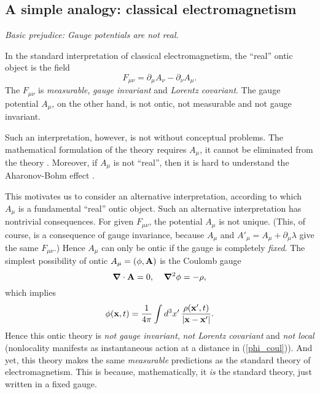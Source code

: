 \documentclass[12pt]{article}
\begin{document}
\subsection{A simple analogy: classical electromagnetism}
\label{SECanalogy}

\begin{flushright}
{\it Basic prejudice: Gauge potentials are not real.} 
\end{flushright}

In the standard interpretation of classical electromagnetism,
the ``real'' ontic object is the field 
\begin{equation}
F_{\mu\nu}=\partial_{\mu}A_{\nu}-\partial_{\nu}A_{\mu} . 
\end{equation}
The $F_{\mu\nu}$ is {\em measurable}, {\em gauge invariant} and {\em Lorentz covariant}. 
The gauge potential $A_{\mu}$, on the other hand, is not ontic, not measurable and not gauge invariant.

Such an interpretation, however, is not without conceptual problems. 
The mathematical formulation of the theory requires $A_{\mu}$, it cannot be eliminated from the theory \cite{wald}. 
Moreover, if $A_{\mu}$ is not ``real'', then it is hard to understand the Aharonov-Bohm effect \cite{AB}.

This motivates us to consider an alternative interpretation, according to  which
$A_{\mu}$ is a fundamental ``real'' ontic object.
Such an alternative interpretation has nontrivial consequences. 
For given $F_{\mu\nu}$, the potential $A_{\mu}$ is not unique. 
(This, of course, is a consequence of gauge invariance, because $A_{\mu}$ and $A'_{\mu}=A_{\mu}+\partial_{\mu}\lambda$ 
give the same  $F_{\mu\nu}$.) 
Hence $A_{\mu}$  can only be ontic if the gauge is completely {\em fixed}.
The simplest possibility of ontic $A_{\mu}=(\phi,{\bf A})$ is the Coulomb gauge
\begin{equation}
\bm{\nabla} \cdot {\bf A}=0, \;\;\;\; \bm{\nabla}^2\phi=-\rho ,
\end{equation}
which implies
\begin{equation}\label{phi_coul}
 \phi({\bf x},t)=\frac{1}{4\pi}\int d^3x' \, \frac{\rho({\bf x}',t)}{|{\bf x}-{\bf x}'|} .
\end{equation}
Hence this ontic theory is {\em not gauge invariant}, {\em not Lorentz covariant} 
and {\em not local} (nonlocality manifests as instantaneous action at a distance in (\ref{phi_coul})). 
And yet, this theory makes the same {\em measurable} predictions 
as the standard theory of electromagnetism. This is because, mathematically,
it {\em is} the standard theory, just written in a fixed gauge. 
\end{document}
